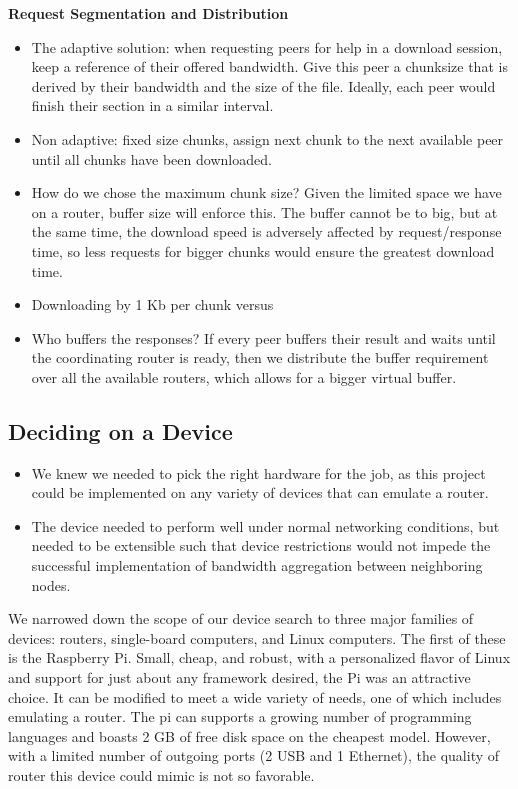 \documentclass[12pt]{article}
\begin{document}
		{\bf Request Segmentation and Distribution}
		\begin{itemize}
			\item The adaptive solution: when requesting peers for help in a download session, keep a reference of their offered bandwidth. Give this peer a chunksize that is derived by their bandwidth and the size of the file. Ideally, each peer would finish their section in a similar interval.
			\item Non adaptive: fixed size chunks, assign next chunk to the next available peer until all chunks have been downloaded.
			\item How do we chose the maximum chunk size? Given the limited space we have on a router, buffer size will enforce this. The buffer cannot be to big, but at the same time, the download speed is adversely affected by request/response time, so less requests for bigger chunks would ensure the greatest download time.
			\item Downloading by 1 Kb per chunk versus 
			\item Who buffers the responses? If every peer buffers their result and waits until the coordinating router is ready, then we distribute the buffer requirement over all the available routers, which allows for a bigger virtual buffer.
		\end{itemize}


	\subsection{Deciding on a Device}
		\begin{itemize}
			\item We knew we needed to pick the right hardware for the job, as this project could be implemented on any variety of devices that can emulate a router.
			\item The device needed to perform well under normal networking conditions, but needed to be extensible such that device restrictions would not impede the successful implementation of bandwidth aggregation between neighboring nodes.
		\end{itemize}

		We narrowed down the scope of our device search to three major families of devices: routers, single-board computers, and Linux computers. The first of these is the Raspberry Pi. Small, cheap, and robust, with a personalized flavor of Linux and support for just about any framework desired, the Pi was an attractive choice. It can be modified to meet a wide variety of needs, one of which includes emulating a router. The pi can supports a growing number of programming languages and boasts 2 GB of free disk space on the cheapest model. However, with a limited number of outgoing ports (2 USB and 1 Ethernet), the quality of router this device could mimic is not so favorable. \\
\end{document}
